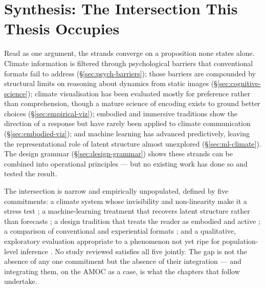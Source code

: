 \section{Synthesis: The Intersection This Thesis Occupies}
\label{sec:literature-synthesis}

Read as one argument, the strands converge on a proposition none states alone. Climate information is filtered through psychological barriers that conventional formats fail to address (\S\ref{sec:psych-barriers}); those barriers are compounded by structural limits on reasoning about dynamics from static images (\S\ref{sec:cognitive-science}); climate visualisation has been evaluated mostly for preference rather than comprehension, though a mature science of encoding exists to ground better choices (\S\ref{sec:empirical-viz}); embodied and immersive traditions show the direction of a response but have rarely been applied to climate communication (\S\ref{sec:embodied-viz}); and machine learning has advanced predictively, leaving the representational role of latent structure almost unexplored (\S\ref{sec:ml-climate}). The design grammar (\S\ref{sec:design-grammar}) shows these strands can be combined into operational principles --- but no existing work has done so and tested the result.

The intersection is narrow and empirically unpopulated, defined by five commitments: a climate system whose invisibility and non-linearity make it a stress test \citep{lenton2008, armstrongmckay2022}; a machine-learning treatment that recovers latent structure rather than forecasts \citep{sonnewald2019, iten2020}; a design tradition that treats the reader as embodied and active \citep{lakoff1999, jansen2015, marriott2018}; a comparison of conventional and experiential formats \citep{harold2016, kause2020}; and a qualitative, exploratory evaluation appropriate to a phenomenon not yet ripe for population-level inference \citep{braunclarke2006}. No study reviewed satisfies all five jointly. The gap is not the absence of any one commitment but the absence of their integration --- and integrating them, on the AMOC as a case, is what the chapters that follow undertake.